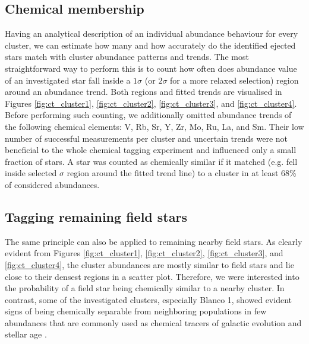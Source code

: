 \subsection{Chemical membership}
\label{sec:chem_ej_tag}
Having an analytical description of an individual abundance behaviour for every cluster, we can estimate how many and how accurately do the identified ejected stars match with cluster abundance patterns and trends. The most straightforward way to perform this is to count how often does abundance value of an investigated star fall inside a $1\sigma$ (or $2\sigma$ for a more relaxed selection) region around an abundance trend. Both regions and fitted trends are visualised in Figures \ref{fig:ct_cluster1}, \ref{fig:ct_cluster2}, \ref{fig:ct_cluster3}, and \ref{fig:ct_cluster4}. Before performing such counting, we additionally omitted abundance trends of the following chemical elements: V, Rb, Sr, Y, Zr, Mo, Ru, La, and Sm. Their low number of successful measurements per cluster and uncertain trends were not beneficial to the whole chemical tagging experiment and influenced only a small fraction of stars.  A star was counted as chemically similar if it matched (e.g. fell inside selected $\sigma$ region around the fitted trend line) to a cluster in at least $68$\% of considered abundances.

\subsection{Tagging remaining field stars}
\label{sec:chem_fi_tag}
The same principle can also be applied to remaining nearby field stars. As clearly evident from Figures \ref{fig:ct_cluster1}, \ref{fig:ct_cluster2}, \ref{fig:ct_cluster3}, and \ref{fig:ct_cluster4}, the cluster abundances are mostly similar to field stars and lie close to their densest regions in a scatter plot. Therefore, we were interested into the probability of a field star being chemically similar to a nearby cluster. In contrast, some of the investigated clusters, especially Blanco 1, showed evident signs of being chemically separable from neighboring populations in few abundances that are commonly used as chemical tracers of galactic evolution and stellar age \citep{2003A&A...410..527B, 2018MNRAS.474.2580S, 2020MNRAS.491.2043L}.

